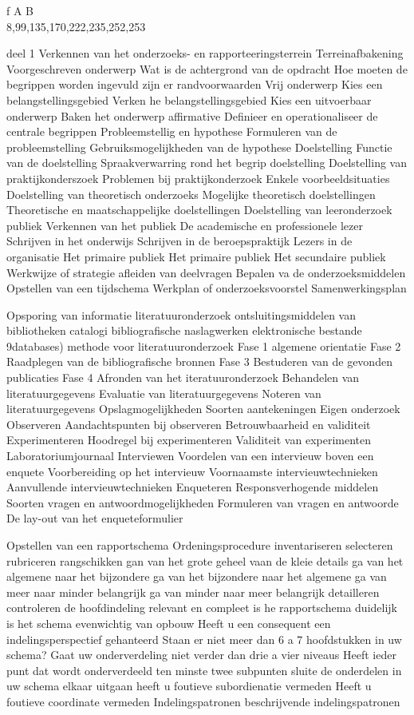 f \colon A \to B \\

8,99,135,170,222,235,252,253


deel 1
Verkennen van het onderzoeks- en rapporteeringsterrein
Terreinafbakening
Voorgeschreven onderwerp
Wat is de achtergrond van de opdracht
Hoe moeten de begrippen worden ingevuld
zijn er randvoorwaarden
Vrij onderwerp
Kies een belangstellingsgebied
Verken he belangstellingsgebied
Kies een uitvoerbaar onderwerp
Baken het onderwerp affirmative
Definieer en operationaliseer de centrale begrippen
Probleemstellig en hypothese
Formuleren van de probleemstelling
Gebruiksmogelijkheden van de hypothese
Doelstelling
Functie van de doelstelling
Spraakverwarring rond het begrip doelstelling
Doelstelling van praktijkonderszoek
Problemen bij praktijkonderzoek
Enkele voorbeeldsituaties
Doelstelling van theoretisch onderzoeks
Mogelijke theoretisch doelstellingen
Theoretische en maatschappelijke doelstellingen
Doelstelling van leeronderzoek
publiek
Verkennen van het publiek
De academische en professionele lezer
Schrijven in het onderwijs
Schrijven in de beroepspraktijk
Lezers in de organisatie
Het primaire  publiek
Het primaire publiek
Het secundaire publiek
Werkwijze of strategie
afleiden van deelvragen
Bepalen va de onderzoeksmiddelen
Opstellen van een tijdschema
Werkplan of onderzoeksvoorstel
Samenwerkingsplan

Opsporing van informatie
literatuuronderzoek
ontsluitingsmiddelen van bibliotheken
catalogi
bibliografische naslagwerken
elektronische bestande  9databases)
methode voor literatuuronderzoek
Fase 1 algemene orientatie
Fase 2 Raadplegen van de bibliografische bronnen
Fase 3 Bestuderen van de gevonden publicaties
Fase 4 Afronden van het iteratuuronderzoek
Behandelen van literatuurgegevens
Evaluatie van literatuurgegevens
Noteren van literatuurgegevens
Opslagmogelijkheden
Soorten aantekeningen
Eigen onderzoek
Observeren
Aandachtspunten bij observeren
Betrouwbaarheid en validiteit
Experimenteren
Hoodregel bij experimenteren
Validiteit van experimenten
Laboratoriumjournaal
Interviewen
Voordelen van een intervieuw boven een enquete
Voorbereiding op het intervieuw
Voornaamste intervieuwtechnieken
Aanvullende intervieuwtechnieken
Enqueteren
Responsverhogende middelen
Soorten vragen en antwoordmogelijkheden
Formuleren van vragen en antwoorde
De lay-out van het enqueteformulier

Opstellen van een rapportschema
Ordeningsprocedure
inventariseren
selecteren
rubriceren
rangschikken
gan van het grote geheel vaan de kleie details
ga van het algemene naar het bijzondere
ga van het bijzondere naar het algemene
ga van meer naar minder belangrijk
ga van minder naar meer belangrijk
detailleren
controleren
de hoofdindeling relevant en compleet
is he rapportschema duidelijk
is het schema evenwichtig van opbouw
Heeft u een consequent een indelingsperspectief gehanteerd
Staan er niet meer dan 6 a 7 hoofdstukken in uw schema?
Gaat uw onderverdeling niet verder dan drie a vier niveaus
Heeft ieder punt dat wordt onderverdeeld ten minste twee subpunten
sluite de onderdelen in uw schema elkaar uitgaan
heeft u foutieve subordienatie vermeden
Heeft u foutieve coordinate vermeden
Indelingspatronen
beschrijvende indelingspatronen

